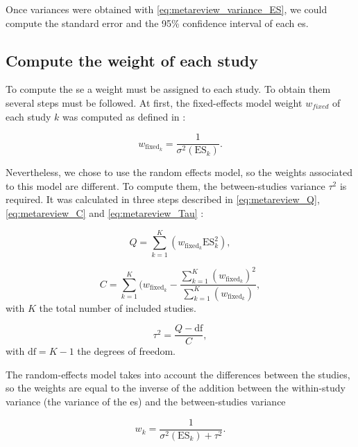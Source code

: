 \documentclass[12pt,a4paper,english]{article}
\begin{document}
Once variances were obtained with \cref{eq:metareview_variance_ES}, we could compute the standard error and the 95\% confidence interval of each \gls{es}. 

\subsection{Compute the weight of each study}

To compute the \gls{se} a weight must be assigned to each study. To obtain them several steps must be followed. At first, the fixed-effects model 
weight $w_{fixed}$ of each study $k$ was computed as defined in \citet{Borenstein2009}: 

\begin{equation}
\label{eq:metareview_weight_fixed_study}
w_{\text{fixed}_k} = \frac{1}{\sigma^2(\text{ES}_k)}.
\end{equation} 

Nevertheless, we chose to use the random effects model, so the weights associated to this model are different. To compute them, the between-studies 
variance $\tau^2$ is required. It was calculated in three steps described in \cref{eq:metareview_Q}, \cref{eq:metareview_C} and \cref{eq:metareview_Tau} 
\citep{Borenstein2009}:

\begin{equation}
\label{eq:metareview_Q}
Q = \sum_{k=1}^{K} (w_{\text{fixed}_k} \text{ES}_k^2),
\end{equation}

\begin{equation}
\label{eq:metareview_C}
C = \sum_{k=1}^{K} (w_{\text{fixed}_k} - \frac{ \sum_{k=1}^{K} (w_{\text{fixed}_k})^2 } { \sum_{k=1}^{K} (w_{\text{fixed}_k}) },
\end{equation}
with $K$ the total number of included studies.

\begin{equation}
\label{eq:metareview_Tau}
\tau^2 = \frac{Q - \text{df}}{C},
\end{equation}
with $\text{df} = K - 1$ the degrees of freedom.

The random-effects model takes into account the differences between the studies, so the weights are equal to the inverse of the addition between the 
within-study variance (the variance of the \gls{es}) and the between-studies variance

\begin{equation}
\label{eq:metareview_weight_study}
w_k = \frac{1}{\sigma^2(\text{ES}_k) + \tau^2}.
\end{equation} 
\end{document}
